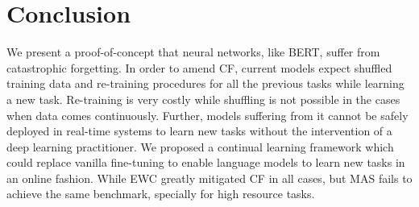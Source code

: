 \documentclass[11pt,a4paper]{article}
\begin{document}





\section{Conclusion}

We present a proof-of-concept that neural networks, like BERT, suffer from catastrophic forgetting. In order to amend CF, current models expect shuffled training data and re-training procedures for all the previous tasks while learning a new task.  Re-training is very costly while shuffling is not possible in the cases when data comes continuously. Further, models suffering from it cannot be safely deployed in real-time systems to learn new tasks without the intervention of a deep learning practitioner.  We proposed a continual learning framework which could replace vanilla fine-tuning to enable language models to learn new tasks in an online fashion.  While EWC greatly mitigated CF in all cases, but MAS fails to achieve the same benchmark, specially for high resource tasks. 
\end{document}
